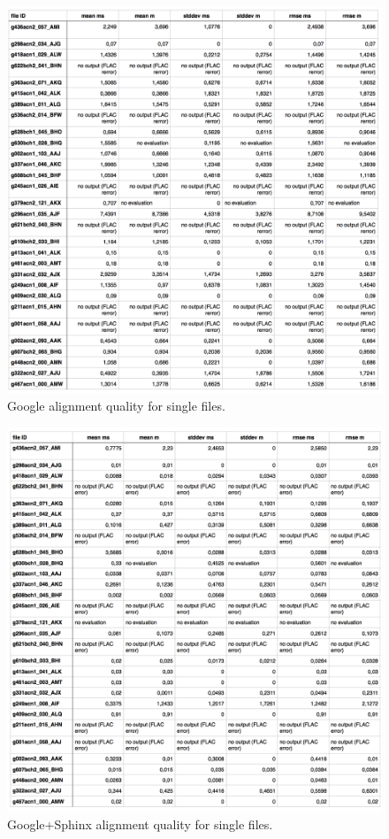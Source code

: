 \begin{figure}[htbp]

  \centering
    \includegraphics[width=1.0\textwidth]{images/googletable.png}
 \caption{ Google alignment quality for single files.  }
\end {figure}

\begin{figure}[htbp]

  \centering
    \includegraphics[width=1.0\textwidth]{images/gsphaltable.png}
 \caption{ Google+Sphinx alignment quality for single files.  }
\end {figure}
